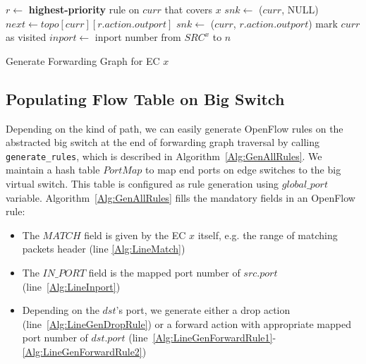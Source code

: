 \begin{algorithm}[h]
\DontPrintSemicolon
{}
 {
         {
                $r \gets$ \textbf{highest-priority} rule on $curr$ that covers $x$\;
                 {\label{Alg:LineDropPath1}
                        $snk \gets$ ($curr$, NULL)\;
                        \;
                        \KwRet\;
                }\label{Alg:LineDropPath2}
                $next \gets topo[curr][r.action.outport]$\;
                 {\label{Alg:LineForwardPath1}
                        $snk \gets$ ($curr$, $r.action.outport$)\;
                        \;
                        \KwRet\;
                }\label{Alg:LineForwardPath2}
                mark $curr$ as visited\;
                \;
        }
}\;
 {\label{Alg:LineStartDFS1}
         {
                $inport \gets$ inport number from $SRC^x$ to $n$\;
                \;
        }
}\label{Alg:LineStartDFS2}
\caption{Generate Forwarding Graph for EC $x$\label{Alg:GenForwardingGraph}}
\end{algorithm}


\subsection{Populating Flow Table on Big Switch}

Depending on the kind of path, we can easily generate OpenFlow rules on the abstracted
big switch at the end of forwarding graph traversal by calling \texttt{generate\_rules},
which is described in Algorithm~\ref{Alg:GenAllRules}.
We maintain a hash table $PortMap$ to map end ports on edge switches to the big virtual switch.
This table is configured as rule generation using $global\_port$ variable.
Algorithm~\ref{Alg:GenAllRules} fills the mandatory fields in an OpenFlow rule:
\begin{itemize}
\item The $MATCH$ field is given by the EC $x$ itself, e.g. the range of matching packets header
        (line \ref{Alg:LineMatch})
\item The $IN\_PORT$ field is the mapped port number of $src.port$ (line~\ref{Alg:LineInport})
\item Depending on the $dst$'s port, we generate either a drop action
        (line~\ref{Alg:LineGenDropRule})
        or a forward action with appropriate mapped port number of $dst.port$ 
        (line~\ref{Alg:LineGenForwardRule1}-\ref{Alg:LineGenForwardRule2})
\end{itemize}



